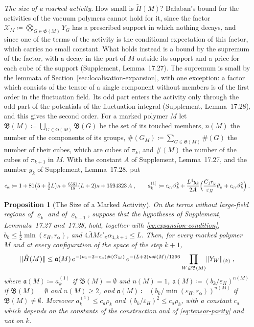 \documentclass[11pt]{preprint}
\DeclarePairedDelimiter{\norm}{\lVert}{\rVert}
\numberwithin{equation}{section}
\newtheorem{proposition}[theorem]{Proposition}
\theoremstyle{definition}
\theoremstyle{remark}
\theoremstyle{plain}
\begin{document}
\emph{The size of a marked activity.} How small is $\tilde H(M)$? Ba{\l}aban's bound for the activities of the vacuum polymers cannot hold for it, since the factor $\mathcal X_M \coloneqq \bigotimes_{G \in \mathfrak G(M)}Y_G$ has a prescribed support in which nothing decays, and since one of the terms of the activity is the conditional expectation of this factor, which carries no small constant. What holds instead is a bound by the supremum of the factor, with a decay in the part of $M$ outside its support and a price for each cube of the support (Supplement, Lemma~17.27). The supremum is small by the lemmata of Section~\ref{sec:localisation-expansion}, with one exception: a factor which consists of the tensor of a single component without members is of the first order in the fluctuation field. Its odd part enters the activity only through the odd part of the potentials of the fluctuation integral (Supplement, Lemma~17.28), and this gives the second order. For a marked polymer $M$ let $\mathfrak B(M) \coloneqq \bigcup_{G \in \mathfrak G(M)}\mathfrak B(G)$ be the set of its touched members, $n(M)$ the number of the components of its groups, $\#(G_M) \coloneqq \sum_{G \in \mathfrak G(M)}\#(G)$ the number of their cubes, which are cubes of $\pi_k$, and $\#(M)$ the number of the cubes of $\pi_{k+1}$ in $M$. With the constant $A$ of Supplement, Lemma~17.27, and the number $y_k$ of Supplement, Lemma~17.28, put
\begin{equation}\label{eq:marked-size-constants}
    c_\kappa \coloneqq 1 + 81\bigl(5 + \tfrac32L\bigr)\kappa + \tfrac{6561}{16}(L + 2)\kappa + 1594323\,A\;,
    \qquad
    a^{(1)}_k \coloneqq c_{\mathrm{ev}}\vartheta_k^2 + \frac{L^4y_k}{2A}\Bigl(\frac{C_1r_y}{\varepsilon_H}\vartheta_k + c_{\mathrm{ev}}\vartheta_k^2\Bigr)\;.
\end{equation}

\begin{proposition}[The Size of a Marked Activity]\label{prop:marked-size}
On the terms without large-field regions of $\varrho_k$ and of $\varrho_{k+1}$, suppose that the hypotheses of Supplement, Lemmata~17.27 and~17.28, hold, together with \eqref{eq:expansion-condition}, $b_k \leq \frac12\min(\varepsilon_H, r_\alpha)$, and $4\bar\Lambda Mc'_\pi\alpha_{1,k+1} \leq L$. Then, for every marked polymer $M$ and at every configuration of the space of the step $k + 1$,
\begin{equation}\label{eq:marked-size}
    \norm{\tilde H(M)} \leq \mathfrak a(M)\,e^{-(\kappa_1 - 2 - c_\kappa)\#(G_M)}\,e^{-(L + 2)\kappa\#(M)/1296}\prod_{W \in \mathfrak B(M)}\norm{Y_W}_{(k)}\;,
\end{equation}
where $\mathfrak a(M) \coloneqq a^{(1)}_k$ if $\mathfrak B(M) = \emptyset$ and $n(M) = 1$, $\mathfrak a(M) \coloneqq (b_k/\varepsilon_H)^{n(M)}$ if $\mathfrak B(M) = \emptyset$ and $n(M) \geq 2$, and $\mathfrak a(M) \coloneqq (b_k/\min(\varepsilon_H, r_\alpha))^{n(M)}$ if $\mathfrak B(M) \neq \emptyset$. Moreover $a^{(1)}_k \leq c_a\rho_k$ and $(b_k/\varepsilon_H)^2 \leq c_a\rho_k$, with a constant $c_a$ which depends on the constants of the construction and of \eqref{eq:tensor-parity} and not on $k$.
\end{proposition}
\end{document}
